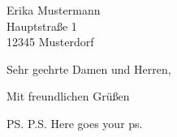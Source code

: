 \usepackage{lipsum}

\usepackage[ngerman]{babel}




\begin{letter}{
Erika Mustermann\\
Hauptstraße 1\\
12345 Musterdorf}

\opening{Sehr geehrte Damen und Herren,}

\lipsum[1-6]

\closing{Mit freundlichen Grüßen}
\ps{P.S. Here goes your ps.}
\end{letter}

